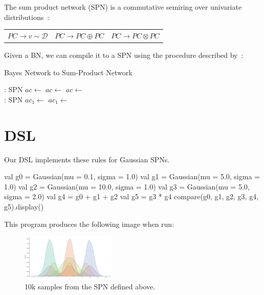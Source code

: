 \documentclass{article}
\begin{document}
The sum product network (SPN) is a commutative semiring over univariate distributions~\citep{friesen2016sum}:

\begin{center}
    \begin{tabular}{ccc}
        $PC \rightarrow v \sim \mathcal{D}$ &
        $PC \rightarrow PC \oplus PC$ &
        $PC \rightarrow PC \otimes PC$
    \end{tabular}
\end{center}

Given a BN, we can compile it to a SPN using the procedure described by~\citet{butz2019sum}:


\begin{algorithm}[H]
\caption{Bayes Network to Sum-Product Network}
\begin{algorithmic}[1]
: SPN
\State $ac \leftarrow $
\State $ac \leftarrow $
\State $ac \leftarrow $
\State {}
\EndProcedure\\
: SPN
\State $ac_1 \leftarrow $ 
\State $ac_1 \leftarrow $ 
\State {}
\Else
\State {}
\EndIf
\EndProcedure
\end{algorithmic}
\end{algorithm}

\section{DSL}

Our DSL implements these rules for Gaussian SPNs.

\begin{kotlinlisting}
val g0 = Gaussian(mu = 0.1,  sigma = 1.0)
val g1 = Gaussian(mu = 5.0,  sigma = 1.0)
val g2 = Gaussian(mu = 10.0, sigma = 1.0)
val g3 = Gaussian(mu = 5.0,  sigma = 2.0)
val g4 = g0 + g1 + g2
val g5 = g3 * g4
compare(g0, g1, g2, g3, g4, g5).display()
\end{kotlinlisting}

This program produces the following image when run:

\begin{figure}[h]
    \includegraphics[width=0.4\textwidth]{plot.png}
    \centering
    \caption{10k samples from the SPN defined above.}
\end{figure}
\end{document}
